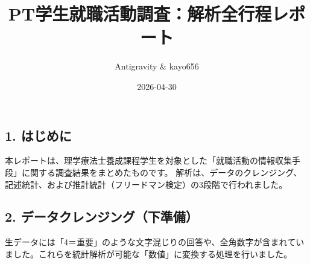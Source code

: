 \documentclass[
]{article}
\title{PT学生就職活動調査：解析全行程レポート}
\author{Antigravity \& kayo656}
\date{2026-04-30}
\begin{document}
\maketitle

{
\setcounter{tocdepth}{2}
\tableofcontents
}
\subsection{1. はじめに}\label{ux306fux3058ux3081ux306b}

本レポートは、理学療法士養成課程学生を対象とした「就職活動の情報収集手段」に関する調査結果をまとめたものです。
解析は、データのクレンジング、記述統計、および推計統計（フリードマン検定）の3段階で行われました。

\subsection{2.
データクレンジング（下準備）}\label{ux30c7ux30fcux30bfux30afux30ecux30f3ux30b8ux30f3ux30b0ux4e0bux6e96ux5099}

生データには「4＝重要」のような文字混じりの回答や、全角数字が含まれていました。これらを統計解析が可能な「数値」に変換する処理を行いました。
\end{document}
